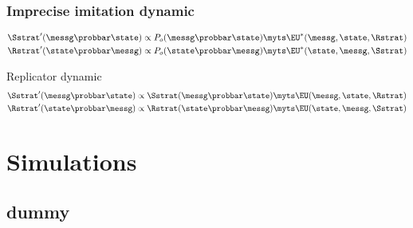 \documentclass[fleqn,9pt,xcolor=dvipsnames]{beamer}
\begin{document}
\begin{frame}
  \frametitle{Imprecise imitation dynamic}
  
  \begin{align*}
  \Sstrat'(\messg \probbar \state) & \propto P_o(\messg \probbar \state) \myts \EU^*(\messg,
  \state, \Rstrat)\\ 
  \Rstrat'(\state \probbar \messg) & \propto P_o(\state \probbar \messg)
  \myts \EU^*(\state, \messg, \Sstrat)
\end{align*}

\bigskip

\begin{block}{Replicator dynamic}
  \begin{align*}
    \Sstrat'(\messg \probbar \state) & \propto \Sstrat(\messg \probbar \state) \myts
    \EU(\messg, \state,\Rstrat) \\ \Rstrat'(\state \probbar \messg) & \propto \Rstrat(\state
    \probbar \messg) \myts \EU(\state, \messg,\Sstrat)
  \end{align*}
\end{block}

\end{frame}

\section{Simulations}
\subsection{dummy}
\end{document}
